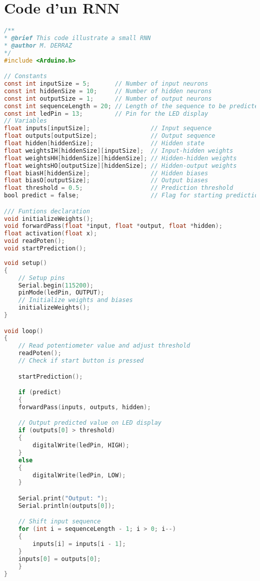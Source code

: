 \section{Code d'un RNN}\label{sec:RNN-code}
\begin{lstlisting}[language=C, caption={Constants for a simple RNN}]
/**
* @brief This code illustrate a small RNN
* @author M. DERRAZ
*/
#include <Arduino.h>

// Constants
const int inputSize = 5;       // Number of input neurons
const int hiddenSize = 10;     // Number of hidden neurons
const int outputSize = 1;      // Number of output neurons
const int sequenceLength = 20; // Length of the sequence to be predicted
const int ledPin = 13;         // Pin for the LED display
// Variables
float inputs[inputSize];                 // Input sequence
float outputs[outputSize];               // Output sequence
float hidden[hiddenSize];                // Hidden state
float weightsIH[hiddenSize][inputSize];  // Input-hidden weights
float weightsHH[hiddenSize][hiddenSize]; // Hidden-hidden weights
float weightsHO[outputSize][hiddenSize]; // Hidden-output weights
float biasH[hiddenSize];                 // Hidden biases
float biasO[outputSize];                 // Output biases
float threshold = 0.5;                   // Prediction threshold
bool predict = false;                    // Flag for starting prediction sequence

/// Funtions declaration
void initializeWeights();
void forwardPass(float *input, float *output, float *hidden);
float activation(float x);
void readPoten();
void startPrediction();
\end{lstlisting}

\newpage

\begin{lstlisting}[language=C, caption={Loop and Setup functions for a simple RNN}]
void setup()
{
    // Setup pins
    Serial.begin(115200);
    pinMode(ledPin, OUTPUT);
    // Initialize weights and biases
    initializeWeights();
}

void loop()
{
    // Read potentiometer value and adjust threshold
    readPoten();
    // Check if start button is pressed

    startPrediction();

    if (predict)
    {
    forwardPass(inputs, outputs, hidden);

    // Output predicted value on LED display
    if (outputs[0] > threshold)
    {
        digitalWrite(ledPin, HIGH);
    }
    else
    {
        digitalWrite(ledPin, LOW);
    }

    Serial.print("Output: ");
    Serial.println(outputs[0]);

    // Shift input sequence
    for (int i = sequenceLength - 1; i > 0; i--)
    {
        inputs[i] = inputs[i - 1];
    }
    inputs[0] = outputs[0];
    }
}
\end{lstlisting}

